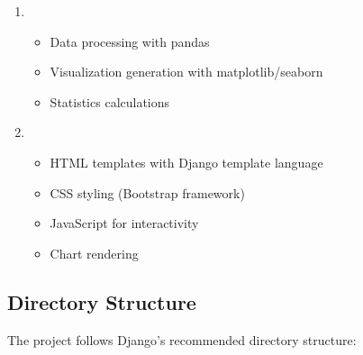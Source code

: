 \documentclass[letterpaper,10pt,english]{sphinxmanual}
\begin{document}
\begin{enumerate}
\begin{itemize}
\end{itemize}

\item {} 
\sphinxAtStartPar
{}
\begin{itemize}
\item {} 
\sphinxAtStartPar
Data processing with pandas

\item {} 
\sphinxAtStartPar
Visualization generation with matplotlib/seaborn

\item {} 
\sphinxAtStartPar
Statistics calculations

\end{itemize}

\item {} 
\sphinxAtStartPar
{}
\begin{itemize}
\item {} 
\sphinxAtStartPar
HTML templates with Django template language

\item {} 
\sphinxAtStartPar
CSS styling (Bootstrap framework)

\item {} 
\sphinxAtStartPar
JavaScript for interactivity

\item {} 
\sphinxAtStartPar
Chart rendering

\end{itemize}

\end{enumerate}


\subsection{Directory Structure}
\label{\detokenize{architecture:directory-structure}}
\sphinxAtStartPar
The project follows Django’s recommended directory structure:
\end{document}
